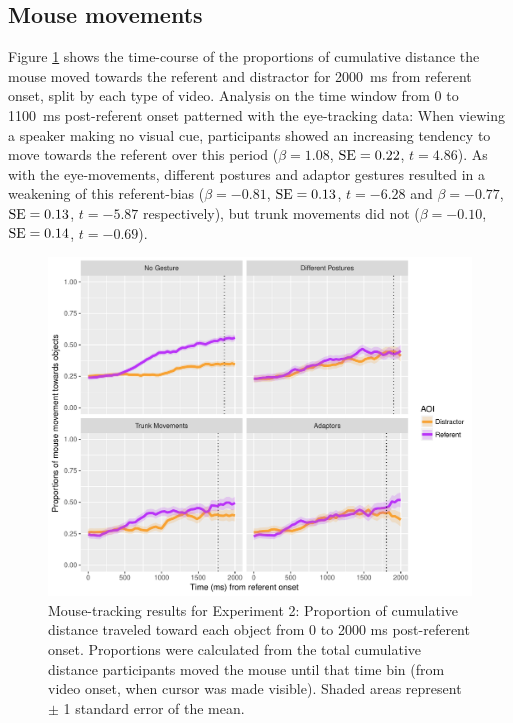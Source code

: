 \documentclass[a4paper,man,natbib]{apa6}
\newcommand{\resultsLM}[3]{$\beta = #1$, $\textnormal{SE} = #2$, $t #3$}
\begin{document}
\subsection{Mouse movements}
Figure \ref{fig:v1_mouse} shows the time-course of the proportions of cumulative distance the mouse moved towards the referent and distractor for 2000~ms from referent onset, split by each type of video.
Analysis on the time window from 0 to 1100~ms post-referent onset patterned with the eye-tracking data:
When viewing a speaker making no visual cue, participants showed an increasing tendency to move towards the referent over this period (\resultsLM{1.08}{0.22}{=4.86}).
As with the eye-movements, different postures and adaptor gestures resulted in a weakening of this referent-bias (\resultsLM{-0.81}{0.13}{=-6.28} and \resultsLM{-0.77}{0.13}{=-5.87} respectively), but trunk movements did not (\resultsLM{-0.10}{0.14}{=-0.69}). 

\begin{figure}[Ht]
  \centering
	\includegraphics[width=\linewidth]{./img/e7_mouset.pdf}
  \caption{Mouse-tracking results for Experiment 2: Proportion of cumulative distance traveled toward each object from 0 to 2000 ms post-referent onset. Proportions were calculated from the total cumulative distance participants moved the mouse until that time bin (from video onset, when cursor was made visible). Shaded areas represent $\pm$ 1 standard error of the mean.}
  \label{fig:v1_mouse}
\end{figure}
\end{document}
